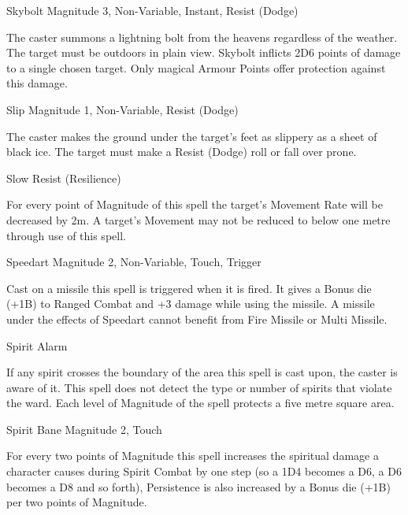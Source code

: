 \begin{rpg-spell}
{Skybolt}
{Magnitude 3, Non-Variable, Instant, Resist (Dodge)}

The caster summons a lightning bolt from the heavens regardless of the weather. The target must be outdoors in plain view. Skybolt inflicts 2D6 points of damage to a single chosen target. Only magical Armour Points offer protection against this damage.
\end{rpg-spell}


\begin{rpg-spell}
{Slip}
{Magnitude 1, Non-Variable, Resist (Dodge)}

  The caster makes the ground under the target’s feet as slippery as a sheet of black ice. The target must make a Resist (Dodge) roll or fall over prone.
\end{rpg-spell}


\begin{rpg-spell}
{Slow}
{Resist (Resilience)}

For every point of Magnitude of this spell the target’s Movement Rate will be decreased by 2m. A target’s Movement may not be reduced to below one metre through use of this spell. 
\end{rpg-spell}


\begin{rpg-spell}
{Speedart}
{Magnitude 2, Non-Variable, Touch, Trigger}

Cast on a missile this spell is triggered when it is fired. It gives a Bonus die (+1B) to Ranged Combat and +3 damage while using the missile. A missile under the effects of Speedart cannot benefit from Fire Missile or Multi Missile.
\end{rpg-spell}


\begin{rpg-spell}
{Spirit Alarm}
{}

If any spirit crosses the boundary of the area this spell is cast upon, the caster is aware of it. This spell does not detect the type or number of spirits that violate the ward. Each level of Magnitude of the spell protects a five metre square area.
\end{rpg-spell}


\begin{rpg-spell}
{Spirit Bane}
{Magnitude 2, Touch}

For every two points of Magnitude this spell increases the spiritual damage a character causes during Spirit Combat by one step (so a 1D4 becomes a D6, a D6 becomes a D8 and so forth), Persistence is also increased by a Bonus die (+1B) per two points of Magnitude.
\end{rpg-spell}


